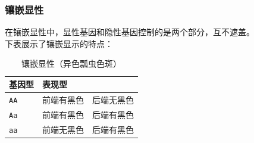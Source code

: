 \documentclass[UTF8]{ctexart}
\begin{document}
\subsubsection{镶嵌显性}
    在镶嵌显性中，显性基因和隐性基因控制的是两个部分，互不遮盖。\\[3mm]
    下表展示了镶嵌显示的特点：
    \begin{table}[h]
        \begin{center}
            \begin{tabular}{l|l}
                \hline
                基因型\qquad\qquad\qquad&表现型\qquad\qquad\qquad\\ \hline
                \texttt{AA}&前端有黑色~~后端无黑色\\ \hline
                \texttt{Aa}&前端有黑色~~后端有黑色\\ \hline
                \texttt{aa}&前端无黑色~~后端有黑色\\ \hline
            \end{tabular}
            \caption{镶嵌显性（异色瓢虫色斑）}
        \end{center}
    \end{table}

\newpage
\end{document}
